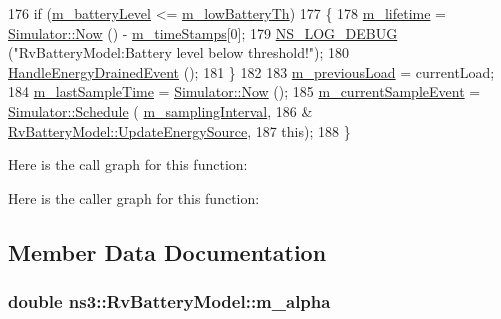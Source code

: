 \begin{DoxyCode}
176   \textcolor{keywordflow}{if} (\hyperlink{classns3_1_1RvBatteryModel_af8c48353c513a2279115e52927b479a0}{m\_batteryLevel} <= \hyperlink{classns3_1_1RvBatteryModel_a01e8c3b6a4ff1b066d2fe0271c216007}{m\_lowBatteryTh})
177     \{
178       \hyperlink{classns3_1_1RvBatteryModel_aab2f6462269e44fda1b9425a6cb8bdf6}{m\_lifetime} = \hyperlink{classns3_1_1Simulator_ac3178fa975b419f7875e7105be122800}{Simulator::Now} () - \hyperlink{classns3_1_1RvBatteryModel_a5748296171832703aa812b6e7389e7da}{m\_timeStamps}[0];
179       \hyperlink{group__logging_ga413f1886406d49f59a6a0a89b77b4d0a}{NS\_LOG\_DEBUG} (\textcolor{stringliteral}{"RvBatteryModel:Battery level below threshold!"});
180       \hyperlink{classns3_1_1RvBatteryModel_ac381990282a8d4a984e5b4322c79f89a}{HandleEnergyDrainedEvent} ();
181     \}
182 
183   \hyperlink{classns3_1_1RvBatteryModel_a53cbe01e0b8ea5e51f4b248bba16170d}{m\_previousLoad} = currentLoad;
184   \hyperlink{classns3_1_1RvBatteryModel_a4b917fecc461f1b2446e307fed5a374f}{m\_lastSampleTime} = \hyperlink{classns3_1_1Simulator_ac3178fa975b419f7875e7105be122800}{Simulator::Now} ();
185   \hyperlink{classns3_1_1RvBatteryModel_a3eb7ced1023c82a8a4714d46e8a97342}{m\_currentSampleEvent} = \hyperlink{classns3_1_1Simulator_a671882c894a08af4a5e91181bf1eec13}{Simulator::Schedule} (
      \hyperlink{classns3_1_1RvBatteryModel_aab7b0edf6e33a0dc26cc633af6b6ac2e}{m\_samplingInterval},
186                                               &
      \hyperlink{classns3_1_1RvBatteryModel_ac0885eeb1b510ffe52531e7e68039d3e}{RvBatteryModel::UpdateEnergySource},
187                                               \textcolor{keyword}{this});
188 \}
\end{DoxyCode}


Here is the call graph for this function\+:




Here is the caller graph for this function\+:




\subsection{Member Data Documentation}
\subsubsection[{\texorpdfstring{m\+\_\+alpha}{m_alpha}}]{\setlength{\rightskip}{0pt plus 5cm}double ns3\+::\+Rv\+Battery\+Model\+::m\+\_\+alpha\hspace{0.3cm}{\ttfamily [private]}}\hypertarget{classns3_1_1RvBatteryModel_af1cad7267993108628a0a9d8ad622212}{}\label{classns3_1_1RvBatteryModel_af1cad7267993108628a0a9d8ad622212}
